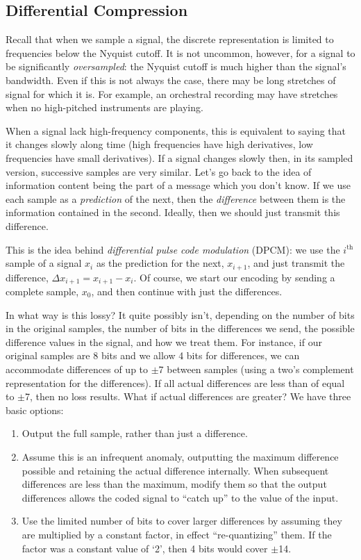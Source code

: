 \subsection{Differential Compression}

Recall that when we sample a signal, the discrete representation is
limited to frequencies below the Nyquist cutoff.  It is not uncommon,
however, for a signal to be significantly \emph{oversampled}: the
Nyquist cutoff is much higher than the signal's bandwidth.  Even if
this is not always the case, there may be long stretches of signal for
which it is.  For example, an orchestral recording may have stretches
when no high-pitched instruments are playing.

When a signal lack high-frequency components, this is equivalent to
saying that it changes slowly along time (high frequencies have high
derivatives, low frequencies have small derivatives).  If a signal
changes slowly then, in its sampled version, successive samples are
very similar. Let's go back to the idea of information content being
the part of a message which you don't know.  If we use each sample as
a \emph{prediction} of the next, then the \emph{difference} between
them is the information contained in the second. Ideally, then we
should just transmit this difference.

This is the idea behind \emph{differential pulse code modulation}
(DPCM): we use the $i^\mathrm{th}$ sample of a signal $x_i$ as the
prediction for the next, $x_{i+1}$, and just transmit the difference,
$\Delta x_{i+1} = x_{i+1} - x_i$. Of course, we start our encoding by
sending a complete sample, $x_0$, and then continue with just the
differences.

In what way is this lossy? It quite possibly isn't, depending on the
number of bits in the original samples, the number of bits in the
differences we send, the possible difference values in the signal, and
how we treat them.  For instance, if our original samples are 8 bits
and we allow 4 bits for differences, we can accommodate differences of
up to $\pm$7 between samples (using a two's complement representation
for the differences).  If all actual differences are less than of
equal to $\pm$7, then no loss results.  What if actual differences are
greater?  We have three basic options:
\begin{enumerate}
\item Output the full sample, rather than just a difference.
\item Assume this is an infrequent anomaly, outputting the maximum
  difference possible and retaining the actual difference internally.
  When subsequent differences are less than the maximum, modify them
  so that the output differences allows the coded signal to ``catch
  up'' to the value of the input.
\item Use the limited number of bits to cover larger differences by
  assuming they are multiplied by a constant factor, in effect
  ``re-quantizing'' them. If the factor was a constant value of `2',
  then 4 bits would cover $\pm$14.
\end{enumerate}

